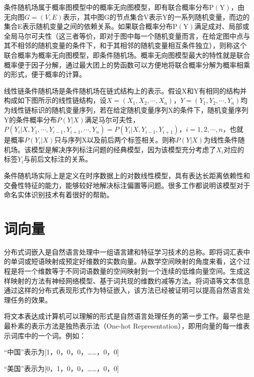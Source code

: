\documentclass[winfonts,master,oneside,nobackinfo]{njuthesis}
\begin{document}
条件随机场属于概率图模型中的概率无向图模型，即有联合概率分布$\mathrm { P } (\mathrm { Y } )$，由无向图$G = ( V , E )$表示，其中图G的节点集合V表示Y的一系列随机变量，而边的集合E表示随机变量之间的依赖关系。如果联合概率分布$\mathrm { P } (\mathrm { Y } )$满足成对、局部或全局马尔可夫性（这三者等价，即对于图中每一个随机变量而言，在给定图中点与其不相邻的随机变量的条件下，和于其相邻的随机变量相互条件独立），则称这个联合概率为概率无向图模型，即条件随机场。概率无向图模型最大的特性就是联合概率便于因子分解，通过最大团上的势函数可以方便地将联合概率分解为概率相乘的形式，便于概率的计算。

线性链条件随机场是条件随机场在链式结构上的表示。假设X和Y有相同的结构并构成如下图所示的线性链结构，设$X = \left( X _ { 1 } , X _ { 2 } , \cdots , X _ { n } \right)$，$Y = \left( Y _ { 1 } , Y _ { 2 } , \cdots , Y _ { n } \right)$均为线性链标识的随机变量序列，若在给定随机变量序列X的条件下，随机变量序列Y的条件概率分布$P ( Y | X )$满足马尔可夫性，$P \left( Y _ { i } | X , Y _ { 1 } , \cdots , Y _ { i - 1 } , Y _ { i + 1 } , \cdots , Y _ { n } \right) = P \left( Y _ { i } | X , Y _ { i - 1 } , Y _ { i + 1 } \right)$，$i = 1,2 , \cdots , n$，也就是概率$P (Y_{i}|X)$只与序列X以及前后两个标签相关。则称$P ( Y | X )$为线性条件随机场。该模型是解决序列标注问题的经典模型，因为该模型充分考虑了$X _ { i }$对应的标签$Y _ { i }$与前后文标注的关系。



条件随机场实际上是定义在时序数据上的对数线性模型，具有表达长距离依赖性和交叠性特征的能力，能够较好地解决标注偏置等问题。很多工作都说明该模型对于命名实体识别技术有着很好的帮助\cite{Settles}。

\section{词向量}
分布式词嵌入是自然语言处理中一组语言建和特征学习技术的总称。即将词汇表中的单词或短语映射成预定好维数的实数向量。从数学空间映射的角度来看，这个过程是将一个维数等于不同词语数量的空间映射到一个连续的低维向量空间。生成这样映射的方法有神经网络模型、基于词共现的维数约减等方法。将词语等文本信息通过这样的分布式表现形式作为特征嵌入，该方法已经被证明可以提高自然语言处理任务的效果。

将文本表达成计算机可以理解的形式是自然语言处理任务的第一步工作。最早也是最朴素的表示方法是独热表示法（One-hot Representation），即用向量的每一维表示词库中的一个词。例如：

“中国”表示为[1，0，0，0，……，0，0]

“美国”表示为[0，1，0，0，……，0，0]
\end{document}

